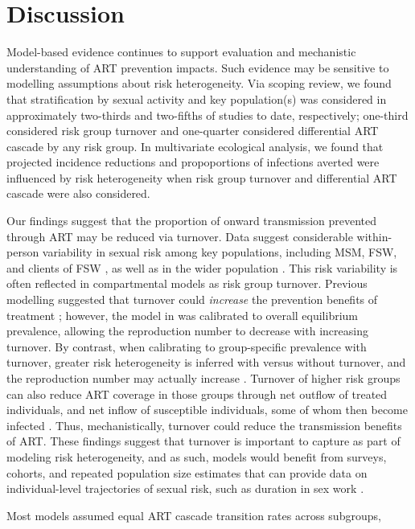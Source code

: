 \section{Discussion}\label{sr.disc}
Model-based evidence continues to support
evaluation and mechanistic understanding of ART prevention impacts.
Such evidence may be sensitive to modelling assumptions about risk heterogeneity.
Via scoping review, we found that stratification by sexual activity and key population(s)
was considered in approximately two-thirds and two-fifths of studies to date, respectively;
one-third considered risk group turnover and one-quarter considered differential ART cascade by any risk group.
In multivariate ecological analysis, we found that
projected incidence reductions and propoportions of infections averted were influenced by
risk heterogeneity when risk group turnover and differential ART cascade were also considered.
\par
Our findings suggest that the proportion of onward transmission prevented through ART
may be reduced via turnover.
Data suggest considerable within-person variability in sexual risk among key populations,
including MSM, FSW, and clients of FSW \cite{Fazito2012,Romero-Severson2012,Roberts2020},
as well as in the wider population \cite{Houle2018}.
This risk variability is often reflected in compartmental models as risk group turnover.
Previous modelling suggested that
turnover could \emph{increase} the prevention benefits of treatment \cite{Henry2015};
however, the model in \cite{Henry2015} was calibrated to overall equilibrium prevalence,
allowing the reproduction number to decrease with increasing turnover.
By contrast, when calibrating to group-specific prevalence with turnover,
greater risk heterogeneity is inferred with versus without turnover,
and the reproduction number may actually increase \cite{Knight2020}.
Turnover of higher risk groups can also reduce ART coverage in those groups through
net outflow of treated individuals, and net inflow of susceptible individuals,
some of whom then become infected \cite{Knight2020}.
Thus, mechanistically, turnover could reduce the transmission benefits of ART.
These findings suggest that turnover is important to capture as part of modeling risk heterogeneity,
and as such, models would benefit from surveys, cohorts, and repeated population size estimates
that can provide data on individual-level trajectories of sexual risk,
such as duration in sex work \cite{Watts2010}.
\par
Most models assumed equal ART cascade transition rates across subgroups,
